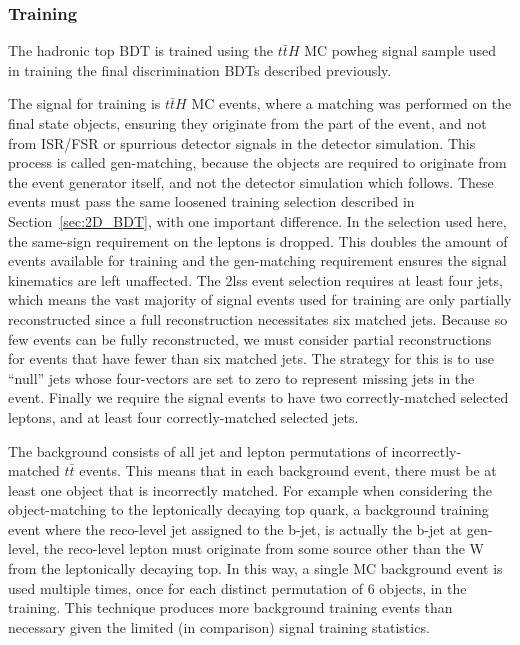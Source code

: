 \subsubsection{Training}
The hadronic top BDT is trained using the $t\bar{t}H$ MC powheg
signal sample used in training the final discrimination BDTs described previously.

The signal for training is $t\bar{t}H$ MC events, where a matching was performed on the final state objects, ensuring
they originate from the \tth part of the event, and not from ISR/FSR or spurrious detector signals in the detector simulation. This process
is called gen-matching, because the objects are required to originate from the event generator itself, and not the detector simulation which
follows. These events must pass the same loosened training selection
described in Section~\ref{sec:2D_BDT}, with one important difference. In the selection used
here, the same-sign requirement on the leptons is dropped. This doubles the amount of events available
for training and the gen-matching requirement ensures the signal kinematics are left unaffected. 
The 2lss event selection requires at least four jets, which means the vast majority of signal
events used for training are only partially reconstructed since a full reconstruction
necessitates six matched jets. Because so few events can be fully reconstructed, we must
consider partial reconstructions for events that have fewer than six matched jets.
The strategy for this is to use ``null'' jets whose four-vectors are set to zero to
represent missing jets in the event. Finally we require the signal events to have two
correctly-matched selected leptons, and at least four correctly-matched selected jets.

The background consists of all jet and lepton permutations of incorrectly-matched
$t\bar{t}$ events. This means that in each background event, there must be at least one
object that is incorrectly matched. For example when considering the object-matching to the
leptonically decaying top quark, a background training event where the reco-level jet assigned
to the b-jet, is actually the b-jet at gen-level, the reco-level lepton must originate from some source
other than the W from the leptonically decaying top. In this way, a single \ttbar MC
background event is used multiple times, once for each distinct permutation of 6 objects, in the training.
This technique produces more background training events than necessary given the limited (in comparison)
signal training statistics.


